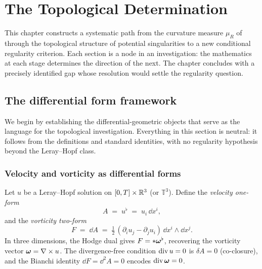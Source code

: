 \chapter{The Topological Determination}\label{ch:determination}

This chapter constructs a systematic path from the curvature measure $\mu_R$ of
 through the topological structure of potential singularities
to a new conditional regularity criterion.  Each section is a node in an
investigation: the mathematics at each stage determines the direction of the next.
The chapter concludes with a precisely identified gap whose resolution would settle
the regularity question.

\section{The differential form framework}\label{sec:det-forms}

We begin by establishing the differential-geometric objects that serve as the
language for the topological investigation.  Everything in this section is
neutral: it follows from the definitions and standard identities, with no
regularity hypothesis beyond the Leray--Hopf class.

\subsection{Velocity and vorticity as differential forms}

Let $u$ be a Leray--Hopf solution on $[0,T]\times\mathbb{R}^3$ (or $\mathbb{T}^3$).
Define the \emph{velocity one-form}
\begin{equation}\label{eq:velocity-one-form}
  A \;=\; u^\flat \;=\; u_i\,\dd x^i,
\end{equation}
and the \emph{vorticity two-form}
\begin{equation}\label{eq:vorticity-two-form}
  F \;=\; \dd A \;=\; \tfrac{1}{2}\,(\partial_i u_j - \partial_j u_i)\,
  \dd x^i \wedge \dd x^j.
\end{equation}
In three dimensions, the Hodge dual gives $F = *\boldsymbol{\omega}^\flat$, recovering the
vorticity vector $\boldsymbol{\omega} = \nabla\times u$.  The divergence-free condition
$\operatorname{div} u = 0$ is $\delta A = 0$ (co-closure), and the Bianchi identity
$\dd F = \dd^2 A = 0$ encodes $\operatorname{div}\boldsymbol{\omega} = 0$.

